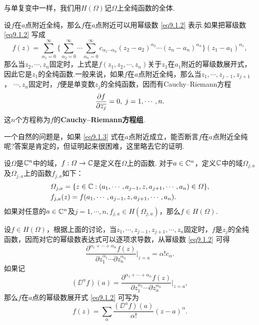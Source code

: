 与单复变中一样，我们用$H(\Omega)$记$\Omega$上全纯函数的全体.

设$f$在$a$点附近全纯，那么$f$在$a$点附近可以用幂级数 \eqref{eq9.1.2} 表示.如果把幂级数 \eqref{eq9.1.2} 写成
\[
  f(z) = \sum_{\alpha_1=0}^\infty\bigg\{\sum_{\alpha_2=0}^\infty\cdots
  \sum_{\alpha_n=0}^\infty c_{\alpha_1\cdots\alpha_n}(z_2-a_2)^{\alpha_2}\cdots(z_n-a_n)^{\alpha_n}\bigg\}
  (z_1-a_1)^{\alpha_1},
\]
那么当$z_2,\cdots,z_n$固定时，上式是$f(z_1,z_2,\cdots,z_n)$关于$z_1$在$a_1$附近的幂级数展开式，因此它是$z_1$的全纯函数.一般来说，如果$f$在$a$点附近全纯，那么当$z_1,\cdots,z_{j-1},z_{j+1}$， $\cdots,z_n$固定时，$f$便是单变数$z_j$的全纯函数，因而有Cauchy--Riemann方程
\begin{equation}\label{eq9.1.3}
  \frac{\partial f}{\partial {}\mkern1mu\overline{\mkern-1muz_j}} = 0,\;j=1,\cdots,n.
\end{equation}
这$n$个方程称为$f$的\textbf{Cauchy--Riemann方程组}.

一个自然的问题是，如果 \eqref{eq9.1.3} 式在$a$点附近成立，能否断言$f$在$a$点附近全纯呢?答案是肯定的，但证明起来很困难，这里略去它的证明.
\begin{theorem}\label{thm9.1.3}
  设$\Omega$是$\mathbb C^n$中的域，$f:\varOmega\to\mathbb C$是定义在$\Omega$上的函数. 对于$a\in\mathbb C^n$，定义$\mathbb C$中的域$\Omega_{j,a}$及$\Omega_{j,a}$上的函数$f_{j,a}$如下：
  \begin{align*}
    & \varOmega_{j,a} = \{z\in\mathbb C:(a_1,\cdots,a_{j-1},z,a_{j+1},\cdots,a_n)\in\varOmega\},\\
    & f_{j,a}(z) = f(a_1,\cdots,a_{j-1},z,a_{j+1},\cdots,a_n).
  \end{align*}
  如果对任意的$a\in\mathbb C^n$及$j=1,\cdots,n,f_{j,a}\in H(\Omega_{j,a})$，那么$f\in H(\Omega)$.
\end{theorem}

设$f\in H(\Omega)$，根据上面的讨论，当$z_1,\cdots,z_{j-1},z_{j+1},\cdots,z_n$固定时，$f$是$z_j$的全纯函数，因而对它的幂级数表达式可以逐项求导数，从幂级数 \eqref{eq9.1.2} 可得
\[
  \frac{\partial^{\alpha_1+\cdots+\alpha_n}f(z)}{\partial z_1^{\alpha_1}
  \cdots\partial z_n^{\alpha_n}}\bigg|_{z=a}=\alpha!c_\alpha.
\]
如果记
\[
  (\DD^\alpha f)(a)=\frac{\partial^{\alpha_1+\cdots+\alpha_n}f(z)}{\partial z_1^{\alpha_1}
  \cdots\partial z_n^{\alpha_n}}\bigg|_{z=a},
\]
那么$f$在$a$点的幂级数展开式 \eqref{eq9.1.2} 可写为
\[
  f(z) = \sum_\alpha\frac{(\DD^\alpha f)(a)}{\alpha!}(z-a)^\alpha.
\]

